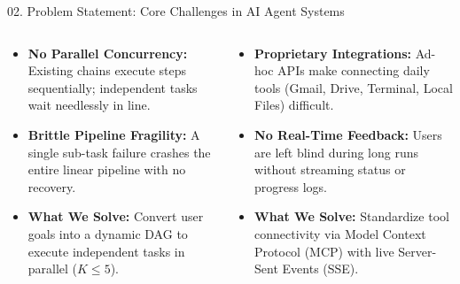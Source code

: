 \documentclass[aspectratio=169,10pt]{beamer}
\begin{document}
\begin{frame}[t]{02. Problem Statement: Core Challenges in AI Agent Systems}
\begin{columns}[T]
\begin{column}{0.485\textwidth}
    \begin{tcolorbox}[
      enhanced, arc=3pt, colframe=prismGold!85!black, colback=white,
      title={\scriptsize\bfseries\color{white}\faRandom\ 2. Sequential \& Rigid Task Execution},
      colbacktitle=prismGold!85!black, boxrule=0.6pt,
      left=4pt, right=4pt, top=2.0pt, bottom=2.0pt
    ]
    \fontsize{5.5}{6.7}\selectfont
    \begin{itemize}\setlength{\itemsep}{1.2pt}
      \item \textbf{No Parallel Concurrency:} Existing chains execute steps sequentially; independent tasks wait needlessly in line.
      \item \textbf{Brittle Pipeline Fragility:} A single sub-task failure crashes the entire linear pipeline with no recovery.
      \item \textbf{\color{prismGold!90!black}What We Solve:} Convert user goals into a dynamic DAG to execute independent tasks in parallel ($K \le 5$).
    \end{itemize}
    \end{tcolorbox}
  \end{column}

  \begin{column}{0.485\textwidth}
    \begin{tcolorbox}[
      enhanced, arc=3pt, colframe=prismTeal!85!black, colback=white,
      title={\scriptsize\bfseries\color{white}\faTools\ 3. Fragmented Tool Silos \& Black-Box Runs},
      colbacktitle=prismTeal!85!black, boxrule=0.6pt,
      left=4pt, right=4pt, top=2.0pt, bottom=2.0pt
    ]
    \fontsize{5.5}{6.7}\selectfont
    \begin{itemize}\setlength{\itemsep}{1.2pt}
      \item \textbf{Proprietary Integrations:} Ad-hoc APIs make connecting daily tools (Gmail, Drive, Terminal, Local Files) difficult.
      \item \textbf{No Real-Time Feedback:} Users are left blind during long runs without streaming status or progress logs.
      \item \textbf{\color{prismTeal!90!black}What We Solve:} Standardize tool connectivity via Model Context Protocol (MCP) with live Server-Sent Events (SSE).
    \end{itemize}
    \end{tcolorbox}

    \vspace{-0.30em}


\end{column}
\end{columns}
\end{frame}
\end{document}
